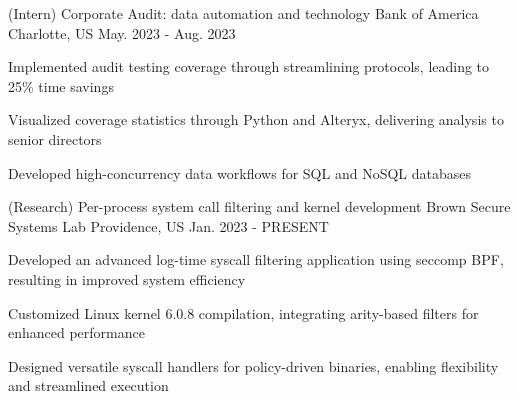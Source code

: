 \begin{cventries}
  \cventry
    {(Intern) Corporate Audit: data automation and technology}
    {Bank of America}
    {Charlotte, US}
    {May. 2023 - Aug. 2023}
    {
      \begin{cvitems}
        \item {Implemented audit testing coverage through streamlining protocols, leading to 25\% time savings}
        \item {Visualized coverage statistics through Python and Alteryx, delivering analysis to senior directors}
        \item {Developed high-concurrency data workflows for SQL and NoSQL databases}
      \end{cvitems}
    }

  \cventry
    {(Research) Per-process system call filtering and kernel development}
    {Brown Secure Systems Lab}
    {Providence, US}
    {Jan. 2023 - PRESENT}
    {
      \begin{cvitems}
        \item {Developed an advanced log-time syscall filtering application using seccomp BPF, resulting in improved system efficiency}
        \item {Customized Linux kernel 6.0.8 compilation, integrating arity-based filters for enhanced performance}
        \item {Designed versatile syscall handlers for policy-driven binaries, enabling flexibility and streamlined execution}      
      \end{cvitems}
    }

  \begin{comment}
  \cventry
    {Machine Learning \& Computation}
    {Chemical Molecular Energy Optimization}
    {Providence, RI}
    {Aug 2022 - Present}
    {
      \begin{cvitems}
        \item {Analyzed traditional Hartree-Fock and DFT methods with Gaussian}
        \item {Implemented the original data pipeline on Brown's Oscar super computing cluster with 200x speed}
        \item {Working on an efficient Belief Propagation network based on HMC}
      \end{cvitems}
    }
  \end{comment}


\end{cventries}

